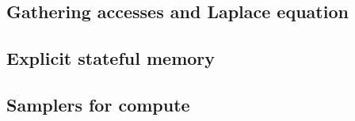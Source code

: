 \documentclass[a4paper,12pt,oneside]{article}
\begin{document}
\subsection{Gathering accesses and Laplace equation}\label{subsec:Laplace}


\subsection{Explicit stateful memory}\label{subsec:Stateful}


\subsection{Samplers for compute}\label{subsec:Samplers}

\end{document}
